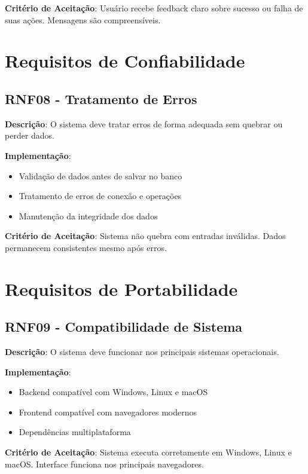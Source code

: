 \documentclass[12pt,a4paper]{article}
\begin{document}
\textbf{Critério de Aceitação}: Usuário recebe feedback claro sobre sucesso ou falha de suas ações. Mensagens são compreensíveis.

\section{Requisitos de Confiabilidade}

\subsection{RNF08 - Tratamento de Erros}

\textbf{Descrição}: O sistema deve tratar erros de forma adequada sem quebrar ou perder dados.

\textbf{Implementação}:
\begin{itemize}
    \item Validação de dados antes de salvar no banco
    \item Tratamento de erros de conexão e operações
    \item Manutenção da integridade dos dados
\end{itemize}

\textbf{Critério de Aceitação}: Sistema não quebra com entradas inválidas. Dados permanecem consistentes mesmo após erros.

\section{Requisitos de Portabilidade}

\subsection{RNF09 - Compatibilidade de Sistema}

\textbf{Descrição}: O sistema deve funcionar nos principais sistemas operacionais.

\textbf{Implementação}:
\begin{itemize}
    \item Backend compatível com Windows, Linux e macOS
    \item Frontend compatível com navegadores modernos
    \item Dependências multiplataforma
\end{itemize}

\textbf{Critério de Aceitação}: Sistema executa corretamente em Windows, Linux e macOS. Interface funciona nos principais navegadores.
\end{document}

